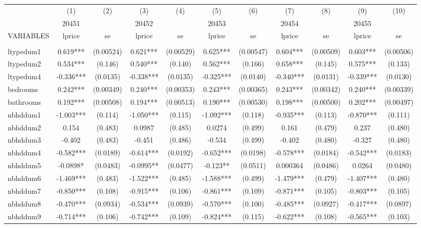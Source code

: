 \documentclass[]{article}
\begin{document}
\begin{tabular}{lcccccccccc} \hline
 & (1) & (2) & (3) & (4) & (5) & (6) & (7) & (8) & (9) & (10) \\
 & 20451 &  & 20452 &  & 20453 &  & 20454 &  & 20455 &  \\
VARIABLES & lprice & se & lprice & se & lprice & se & lprice & se & lprice & se \\ \hline
 &  &  &  &  &  &  &  &  &  &  \\
ltypedum1 & 0.619*** & (0.00524) & 0.621*** & (0.00529) & 0.625*** & (0.00547) & 0.604*** & (0.00509) & 0.603*** & (0.00506) \\
ltypedum2 & 0.534*** & (0.146) & 0.540*** & (0.140) & 0.562*** & (0.166) & 0.658*** & (0.145) & 0.575*** & (0.133) \\
ltypedum4 & -0.336*** & (0.0135) & -0.338*** & (0.0135) & -0.325*** & (0.0140) & -0.340*** & (0.0131) & -0.339*** & (0.0130) \\
bedrooms & 0.242*** & (0.00349) & 0.240*** & (0.00353) & 0.243*** & (0.00365) & 0.243*** & (0.00342) & 0.240*** & (0.00339) \\
bathrooms & 0.192*** & (0.00508) & 0.194*** & (0.00513) & 0.190*** & (0.00530) & 0.198*** & (0.00500) & 0.202*** & (0.00497) \\
nbhddum1 & -1.003*** & (0.114) & -1.050*** & (0.115) & -1.092*** & (0.118) & -0.935*** & (0.113) & -0.870*** & (0.111) \\
nbhddum2 & 0.154 & (0.483) & 0.0987 & (0.485) & 0.0274 & (0.499) & 0.161 & (0.479) & 0.237 & (0.480) \\
nbhddum3 & -0.402 & (0.483) & -0.451 & (0.486) & -0.534 & (0.499) & -0.402 & (0.480) & -0.327 & (0.480) \\
nbhddum4 & -0.582*** & (0.0189) & -0.614*** & (0.0192) & -0.652*** & (0.0198) & -0.578*** & (0.0184) & -0.542*** & (0.0183) \\
nbhddum5 & -0.0898* & (0.0483) & -0.0995** & (0.0477) & -0.123** & (0.0511) & 0.000364 & (0.0486) & 0.0264 & (0.0480) \\
nbhddum6 & -1.469*** & (0.483) & -1.522*** & (0.485) & -1.588*** & (0.499) & -1.479*** & (0.479) & -1.407*** & (0.480) \\
nbhddum7 & -0.850*** & (0.108) & -0.915*** & (0.106) & -0.861*** & (0.109) & -0.871*** & (0.105) & -0.803*** & (0.105) \\
nbhddum8 & -0.470*** & (0.0934) & -0.534*** & (0.0939) & -0.570*** & (0.100) & -0.485*** & (0.0927) & -0.417*** & (0.0897) \\
nbhddum9 & -0.714*** & (0.106) & -0.742*** & (0.109) & -0.824*** & (0.115) & -0.622*** & (0.108) & -0.565*** & (0.103) \\

\end{tabular}
\end{document}
